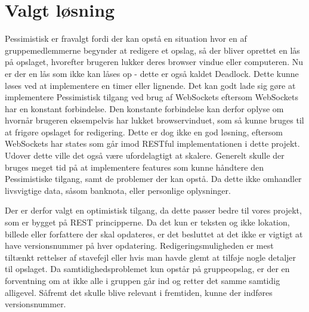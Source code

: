 \section{Valgt løsning}\label{sec:chosen_solution}
Pessimistisk er fravalgt fordi der kan opstå en situation hvor en af gruppemedlemmerne begynder at redigere et opslag, så der bliver oprettet en lås på opslaget, hvorefter brugeren lukker deres browser vindue eller computeren. Nu er der en lås som ikke kan låses op - dette er også kaldet Deadlock\cite{deadlock}. Dette kunne løses ved at implementere en timer eller lignende. Det kan godt lade sig gøre at implementere Pessimistisk tilgang ved brug af WebSockets\cite{websockets} eftersom WebSockets har en konstant forbindelse. Den konstante forbindelse kan derfor oplyse om hvornår brugeren eksempelvis har lukket browservinduet, som så kunne bruges til at frigøre opslaget for redigering. Dette er dog ikke en god løsning, eftersom WebSockets har states som går imod RESTful implementationen i dette projekt. Udover dette ville det også være ufordelagtigt at skalere.
Generelt skulle der bruges meget tid på at implementere features som kunne håndtere den Pessimistiske tilgang, samt de problemer der kan opstå. Da dette ikke omhandler livsvigtige data, såsom banknota, eller personlige oplysninger. 

Der er derfor valgt en optimistisk tilgang, da dette passer bedre til vores projekt, som er bygget på REST principperne. Da det kun er teksten og ikke lokation, billede eller forfattere der skal opdateres, er det besluttet at det ikke er vigtigt at have versionsnummer på hver opdatering. Redigeringsmuligheden er mest tiltænkt rettelser af stavefejl eller hvis man havde glemt at tilføje nogle detaljer til opslaget. Da samtidighedsproblemet kun opstår på gruppeopslag, er der en forventning om at ikke alle i gruppen går ind og retter det samme samtidig alligevel. Såfremt det skulle blive relevant i fremtiden, kunne der indføres versionsnummer. 
